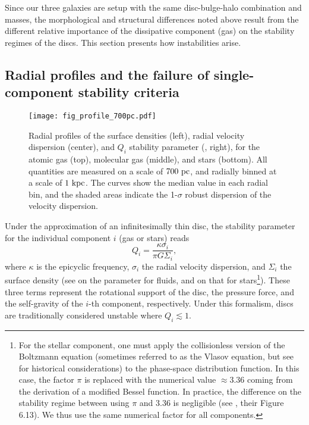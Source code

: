 \documentclass[useAMS,usenatbib]{mnras}
\begin{document}
Since our three galaxies are setup with the same disc-bulge-halo combination and masses, the morphological and structural differences noted above result from the different relative importance of the dissipative component (gas) on the stability regimes of the discs. This section presents how instabilities arise.

\subsection{Radial profiles and the failure of single-component stability criteria}
\label{sec:radial}

\begin{figure*}
\centering
\texttt{[image: fig\_profile\_700pc.pdf]}
\caption{Radial profiles of the surface densities (left), radial velocity dispersion (center), and $Q_i$ stability parameter (, right), for the atomic gas (top), molecular gas (middle), and stars (bottom). All quantities are measured on a scale of $700\mathrm{~pc}$, and radially binned at a scale of $1 \mathrm{~kpc}$. The curves show the median value in each radial bin, and the shaded areas indicate the 1-$\sigma$ robust dispersion of the velocity dispersion.}
\label{fig:profilelowres}
\end{figure*}

Under the approximation of an infinitesimally thin disc, the stability parameter for the individual component $i$ (gas or stars) reads
\begin{equation}
\label{eqn:qt}
Q_i = \frac{\kappa \sigma_i}{\pi G \Sigma_i},
\end{equation}
where $\kappa$ is the epicyclic frequency, $\sigma_i$ the radial velocity dispersion, and $\Sigma_i$ the surface density (see \citealt{Safronov1960, Goldreich1965} on the parameter for fluids, and \citealt{Toomre1964} on that for stars\footnote{For the stellar component, one must apply the collisionless version of the Boltzmann equation (sometimes referred to as the Vlasov equation, but see \citealt{Henon1982} for historical considerations) to the phase-space distribution function. In this case, the factor $\pi$ is replaced with the numerical value $\approx 3.36$ coming from the derivation of a modified Bessel function. In practice, the difference on the stability regime between using $\pi$ and 3.36 is negligible (see \citealt{Binney2008}, their Figure 6.13). We thus use the same numerical factor for all components.}). These three terms represent the rotational support of the disc, the pressure force, and the self-gravity of the $i$-th component, respectively. Under this formalism, discs are traditionally considered unstable where $Q_i \lesssim 1$. 
\end{document}
